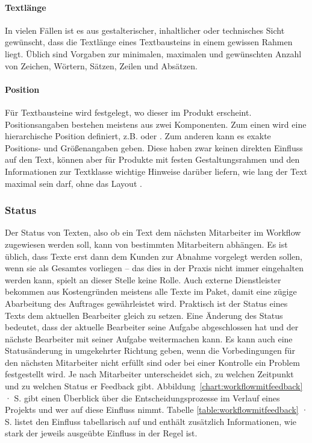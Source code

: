 \paragraph{Textlänge} In vielen Fällen ist es aus gestalterischer, inhaltlicher oder technisches Sicht gewünscht, dass die Textlänge eines Textbausteins in einem gewissen Rahmen liegt. Üblich sind Vorgaben zur minimalen, maximalen und gewünschten Anzahl von Zeichen, Wörtern, Sätzen, Zeilen und Absätzen.

\paragraph{Position} Für Textbausteine wird festgelegt, wo dieser im Produkt erscheint. Positionsangaben bestehen meistens aus zwei Komponenten. Zum einen wird eine hierarchische Position definiert, z.B.  oder . Zum anderen kann es exakte Positions- und Größenangaben geben. Diese haben zwar keinen direkten Einfluss auf den Text, können aber für Produkte mit festen Gestaltungsrahmen und den Informationen zur Textklasse wichtige Hinweise darüber liefern, wie lang der Text maximal sein darf, ohne das Layout .

\subsubsection{Status}\label{l:konzept-workflow-status}

Der Status von Texten, also ob ein Text dem nächsten Mitarbeiter im Workflow zugewiesen werden soll, kann von bestimmten Mitarbeitern abhängen. Es ist üblich, dass Texte erst dann dem Kunden zur Abnahme vorgelegt werden sollen, wenn sie als Gesamtes vorliegen -- das dies in der Praxis nicht immer eingehalten werden kann, spielt  an dieser Stelle keine Rolle. Auch externe Dienstleister bekommen aus Kostengründen meistens alle Texte im Paket, damit eine zügige Abarbeitung des Auftrages gewährleistet wird. Praktisch ist der Status eines Texts dem aktuellen Bearbeiter gleich zu setzen. Eine Änderung des Status bedeutet, dass der aktuelle Bearbeiter seine Aufgabe abgeschlossen hat und der nächste Bearbeiter mit seiner Aufgabe weitermachen kann. Es kann auch eine Statusänderung in umgekehrter Richtung geben, wenn die Vorbedingungen für den nächsten Mitarbeiter nicht erfüllt sind oder bei einer Kontrolle ein Problem festgestellt wird. Je nach Mitarbeiter unterscheidet sich, zu welchen Zeitpunkt und zu welchen Status er Feedback gibt. Abbildung~\ref{chart:workflowmitfeedback} · S.\pageref{chart:workflowmitfeedback} gibt einen Überblick über die Entscheidungsprozesse im Verlauf eines Projekts und wer auf diese Einfluss nimmt. Tabelle \ref{table:workflowmitfeedback} · S.\pageref{table:workflowmitfeedback} listet den Einfluss tabellarisch auf und enthält zusätzlich Informationen, wie stark der jeweils ausgeübte Einfluss in der Regel ist.


